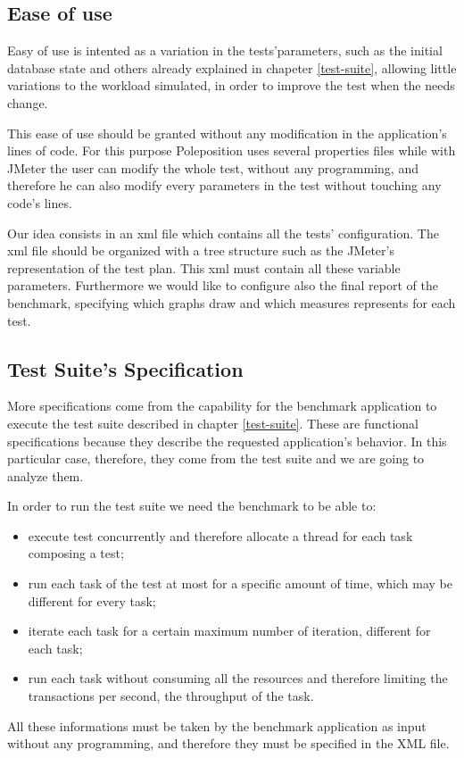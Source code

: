 		\subsection{Ease of use}
Easy of use is intented as a variation in the tests'parameters, such as the initial database state and others already explained in chapeter \ref{test-suite}, allowing little variations to the workload simulated, in order to improve the test when the needs change. 

This ease of use should be granted without any modification in the application's lines of code. For this purpose Poleposition uses several properties files while with JMeter the user can modify the whole test, without any programming, and therefore he can also modify every parameters in the test without touching any code's lines.

Our idea consists in an xml file which contains all the tests' configuration. The xml file should be organized with a tree structure such as the JMeter's representation of the test plan. This xml must contain all these variable parameters. Furthermore we would like to configure also the final report of the benchmark, specifying which graphs draw and which measures represents for each test.

		\subsection{Test Suite's Specification}
More specifications come from the capability for the benchmark application to execute the test suite described in chapter \ref{test-suite}. These are functional specifications because they describe the requested application's behavior. In this particular case, therefore, they come from the test suite and we are going to analyze them. 

In order to run the test suite we need the benchmark to be able to:
\begin{itemize}
	\item execute test concurrently and therefore allocate a thread for each task composing a test; 
	\item run each task of the test at most for a specific amount of time, which may be different for every task;
	\item iterate each task for a certain maximum number of iteration, different for each task;
	\item run each task without consuming all the resources and therefore limiting the transactions per second, the throughput of the task.
\end{itemize}
All these informations must be taken by the benchmark application as input without any programming, and therefore they must be specified in the XML file.	
		
